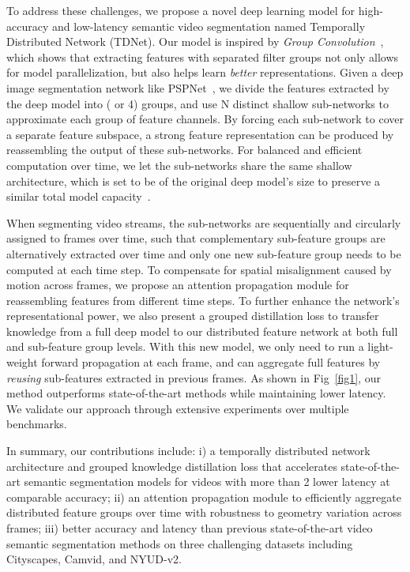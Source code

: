 \documentclass[10pt,twocolumn,letterpaper]{article}
\begin{document}
To address these challenges, we propose a novel deep learning model for high-accuracy and low-latency semantic video segmentation named Temporally Distributed Network (TDNet).
Our model is inspired by \textit{Group Convolution}~\cite{ioannou2017deep,krizhevsky2012imagenet}, which shows that extracting features with separated filter groups not only allows for model parallelization, but also helps learn \emph{better} representations.  
Given a deep image segmentation network like PSPNet~\cite{zhao2017pyramid}, we divide the features extracted by the deep model into  ( or 4) groups, and use N distinct shallow sub-networks to approximate each group of feature channels. 
By forcing each sub-network to cover a separate feature subspace, a strong feature representation can be produced by reassembling the output of these sub-networks. 
For balanced and efficient computation over time, we let the  sub-networks share the same shallow architecture, which is set to be  of the original deep model's size to preserve a similar total model capacity~\cite{wu2019wider,szegedy2017inception,Zagoruyko2016WRN}. 

When segmenting video streams, the  sub-networks are sequentially and circularly assigned to frames over time, such that complementary sub-feature groups are alternatively extracted over time and only one new sub-feature group needs to be computed at each time step. 
To compensate for spatial misalignment caused by motion across frames, we propose an attention propagation module for reassembling features from different time steps. 
To further enhance the network's representational power, we also present a grouped distillation loss to transfer knowledge from a full deep model to our distributed feature network at both full and sub-feature group levels. With this new model, we only need to run a light-weight forward propagation at each frame, and can aggregate full features by \emph{reusing} sub-features extracted in previous frames.
As shown in Fig~\ref{fig1}, our method outperforms state-of-the-art methods while maintaining lower latency.
We validate our approach through extensive experiments over multiple benchmarks. 

In summary, our contributions include: i) a temporally distributed network architecture and grouped knowledge distillation loss that accelerates state-of-the-art semantic segmentation models for videos with more than 2 lower latency at comparable accuracy; ii) an attention propagation module to efficiently aggregate distributed feature groups over time with robustness to geometry variation across frames; iii) better accuracy and latency than previous state-of-the-art video semantic segmentation methods on three challenging datasets including Cityscapes, Camvid, and NYUD-v2. 
\end{document}
